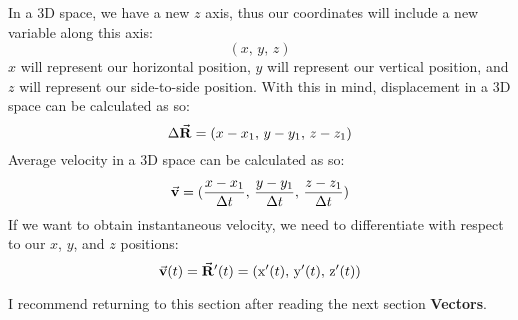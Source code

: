\documentclass{article}
\newcommand{\x}{\mathrm{x}}
\begin{document}
\newpage
\noindent In a 3D space, we have a new $z$ axis, thus our coordinates will include a new variable along this axis:
\[(x,\,y,\,z)\]
$x$ will represent our horizontal position, $y$ will represent our vertical position, and $z$ will represent our side-to-side position. 
With this in mind, displacement in a 3D space can be calculated as so:
\[\Delta \va{R} = (x-x_1,\, y-y_1,\, z-z_1)\]
Average velocity in a 3D space can be calculated as so:
\[\va{v} = (\frac{x-x_1}{\Delta t},\, \frac{y-y_1}{\Delta t},\, \frac{z-z_1}{\Delta t}) \]
If we want to obtain instantaneous velocity, we need to differentiate with respect to our
$x$, $y$, and $z$ positions:
\[\va{v}(t) = \va{R}'(t) = (\x'(t),\, \mathrm{y}'(t),\, \mathrm{z}'(t))\]

{\noindent \small I recommend returning to this section after reading the next section \textbf{Vectors}.}

\newpage
\end{document}
